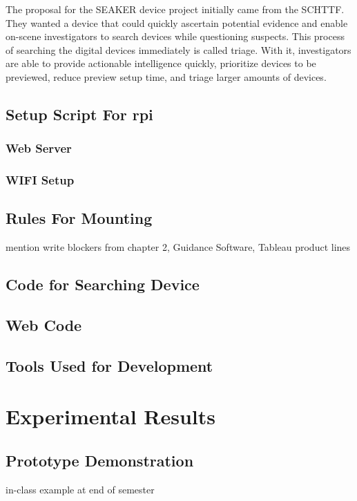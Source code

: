 \documentclass[12pt]{article}
\begin{document}
The proposal for the SEAKER device project initially came from the SCHTTF.  They wanted
a device that could quickly ascertain potential evidence and enable on-scene investigators
to search devices while questioning suspects.  This process of searching the digital devices
immediately is called triage.  With it, investigators are able to provide actionable
intelligence quickly, prioritize devices to be previewed, reduce preview setup time, and
triage larger amounts of devices.\\

\subsection{Setup Script For \gls{rpi}}

\subsubsection{Web Server}

\subsubsection{WIFI Setup}

\subsection{Rules For Mounting}

mention write blockers from chapter 2, Guidance Software, Tableau product lines

\subsection{Code for Searching Device}

\subsection{Web Code}

\subsection{Tools Used for Development}


\section{Experimental Results}
\label{sect-experimentalResults}

\subsection{Prototype Demonstration}
in-class example at end of semester
\end{document}
